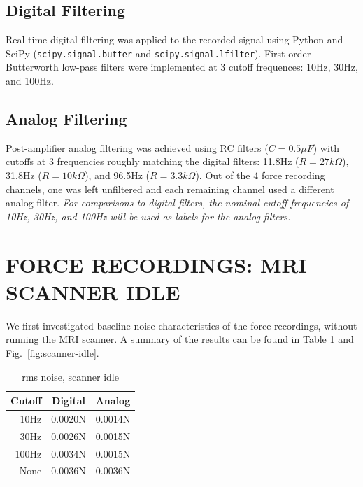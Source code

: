 \documentclass[letterpaper, 10 pt, conference]{ieeeconf}  %
\begin{document}
\subsection{Digital Filtering}

Real-time digital filtering was applied to the recorded signal using Python and SciPy (\texttt{scipy.signal.butter} and \texttt{scipy.signal.lfilter}). First-order Butterworth low-pass filters were implemented at 3 cutoff frequences: 10Hz, 30Hz, and 100Hz.

\subsection{Analog Filtering}

Post-amplifier analog filtering was achieved using RC filters ($C=0.5\mu F$) with cutoffs at 3 frequencies roughly matching the digital filters: 11.8Hz ($R=27k\Omega$), 31.8Hz ($R=10k\Omega$), and 96.5Hz ($R=3.3k\Omega$). Out of the 4 force recording channels, one was left unfiltered and each remaining channel used a different analog filter. \textit{For comparisons to digital filters, the nominal cutoff frequencies of 10Hz, 30Hz, and 100Hz will be used as labels for the analog filters.}

\section{FORCE RECORDINGS: MRI SCANNER IDLE}

We first investigated baseline noise characteristics of the force recordings, without running the MRI scanner. A summary of the results can be found in Table \ref{table:scanner-idle} and Fig.\ \ref{fig:scanner-idle}.

\begin{table}[h]
\caption{rms noise, scanner idle}
\label{table:scanner-idle}
\begin{center}
\begin{tabular}{|r||c|c|}
\hline
\textbf{Cutoff} & \textbf{Digital} & \textbf{Analog}\\
\hline
10Hz & 0.0020N & 0.0014N\\
\hline
30Hz & 0.0026N & 0.0015N\\
\hline
100Hz & 0.0034N & 0.0015N\\
\hline
None & 0.0036N & 0.0036N\\
\hline
\end{tabular}
\end{center}
\end{table}
\end{document}
